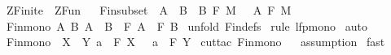 %
\begin{isabellebody}%
\def\isabellecontext{ZFinite}%
%
\isamarkuptrue%
%
\isadelimtheory
%
\endisadelimtheory
%
\isatagtheory
{}\isamarkupfalse%
\ ZFinite\ \ ZFun\ %
\endisatagtheory
{\isafoldtheory}%
%
\isadelimtheory
%
\endisadelimtheory
\ \isanewline
\isanewline
\isanewline
{}\isamarkupfalse%
\isanewline
Fin{\isacharunderscore}subset{\isacharcolon}\ {\isachardoublequoteopen}{\isacharbrackleft}{\isacharbar}\ A\ {\isacharless}{\isacharequal}\ B{\isacharsemicolon}\ \ B{\isacharcolon}\ {\isacharpercent}F\ M\ {\isacharbar}{\isacharbrackright}\ {\isacharequal}{\isacharequal}{\isachargreater}\ A{\isacharcolon}\ {\isacharpercent}F\ M{\isachardoublequoteclose}\isanewline
\isanewline
\isanewline
{}\isamarkupfalse%
\ Fin{\isacharunderscore}mono{\isacharcolon}\ {\isachardoublequoteopen}{\isacharbang}{\isacharbang}A\ B{\isachardot}\ A\ {\isacharless}{\isacharequal}\ B\ {\isacharequal}{\isacharequal}{\isachargreater}\ {\isacharpercent}F\ A\ {\isacharless}{\isacharequal}\ {\isacharpercent}F\ B{\isachardoublequoteclose}\isanewline
%
\isadelimproof
%
\endisadelimproof
%
\isatagproof
{}\isamarkupfalse%
\ {\isacharparenleft}unfold\ Fin{\isachardot}defs{\isacharparenright}\isanewline
{}\isamarkupfalse%
\ {\isacharparenleft}rule\ lfp{\isacharunderscore}mono{\isacharparenright}\isanewline
{}\isamarkupfalse%
\ auto\isanewline
{}\isamarkupfalse%
%
\endisatagproof
{\isafoldproof}%
%
\isadelimproof
\isanewline
%
\endisadelimproof
\isanewline
{}\isamarkupfalse%
\ Fin{\isacharunderscore}mono{}{\isacharcolon}\ {\isachardoublequoteopen}{\isacharbrackleft}{\isacharbar}\ X\ {\isacharless}{\isacharequal}\ Y{\isacharsemicolon}\ a\ {\isacharcolon}\ {\isacharpercent}F\ X\ {\isacharbar}{\isacharbrackright}\ {\isacharequal}{\isacharequal}{\isachargreater}\ a\ {\isacharcolon}\ {\isacharpercent}F\ Y{\isachardoublequoteclose}\isanewline
%
\isadelimproof
%
\endisadelimproof
%
\isatagproof
{}\isamarkupfalse%
\ {\isacharparenleft}cut{\isacharunderscore}tac\ Fin{\isacharunderscore}mono{\isacharparenright}\isanewline
{}\isamarkupfalse%
\ {}\isanewline
{}\isamarkupfalse%
\ assumption\isanewline
{}\isamarkupfalse%
\ fast\isanewline
{}\isamarkupfalse%
%
\endisatagproof
{\isafoldproof}%
%
\isadelimproof
\isanewline
%
\endisadelimproof

\end{isabellebody}
